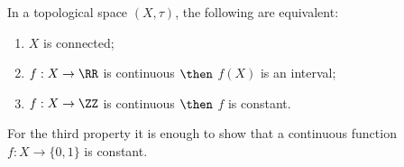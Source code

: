\documentclass[12pt, a4paper]{article}
\begin{document}
\begin{mdthm}
    In a topological space \((X,\tau)\), the following are equivalent:
    \begin{enumerate}
        \item \(X\) is connected;
        \item \(f : X \to \RR\) is continuous \(\then\) \(f(X)\) is an interval;
        \item \(f:X \to \ZZ\) is continuous \(\then\) \(f\) is constant.
    \end{enumerate}
\end{mdthm}

\begin{mdremark}
    For the third property it is enough to show that a continuous function \(f:X \to \{0,1\}\) is constant.
\end{mdremark}
\end{document}
